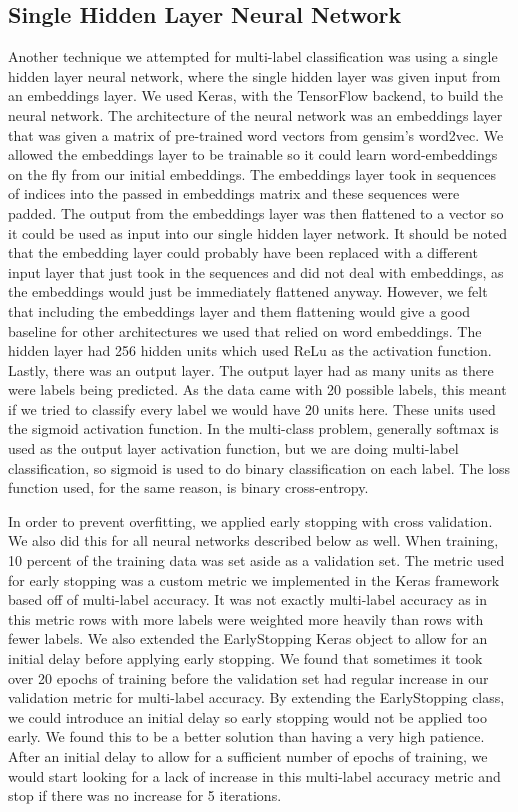 \documentclass[sigconf]{acmart}
\begin{document}
\subsection{Single Hidden Layer Neural Network}
Another technique we attempted for multi-label classification was using a single hidden layer neural network, where the single hidden layer was given input from an embeddings layer. We used Keras, with the TensorFlow backend, to build the neural network.  The architecture of the neural network was an embeddings layer that was given a matrix of pre-trained word vectors from gensim's word2vec.  We allowed the embeddings layer to be trainable so it could learn word-embeddings on the fly from our initial embeddings. The embeddings layer took in sequences of indices into the passed in embeddings matrix and these sequences were padded. The output from the embeddings layer was then flattened to a vector so it could be used as input into our single hidden layer network. It should be noted that the embedding layer could probably have been replaced with a different input layer that just took in the sequences and did not deal with embeddings, as the embeddings would just be immediately flattened anyway.  However, we felt that including the embeddings layer and them flattening would give a good baseline for other architectures we used that relied on word embeddings.  The hidden layer had 256 hidden units which used ReLu as the activation function.  Lastly, there was an output layer.  The output layer had as many units as there were labels being predicted. As the data came with 20 possible labels, this meant if we tried to classify every label we would have 20 units here.  These units used the sigmoid activation function. In the multi-class problem, generally softmax is used as the output layer activation function, but we are doing multi-label classification, so sigmoid is used to do binary classification on each label.  The loss function used, for the same reason, is binary cross-entropy. 

In order to prevent overfitting, we applied early stopping with cross validation. We also did this for all neural networks described below as well.  When training, 10 percent of the training data was set aside as a validation set.  The metric used for early stopping was a custom metric we implemented in the Keras framework based off of multi-label accuracy. It was not exactly multi-label accuracy as in this metric rows with more labels were weighted more heavily than rows with fewer labels. We also extended the EarlyStopping Keras object to allow for an initial delay before applying early stopping. We found that sometimes it took over 20 epochs of training before the validation set had regular increase in our validation metric for multi-label accuracy. By extending the EarlyStopping class, we could introduce an initial delay so early stopping would not be applied too early. We found this to be a better solution than having a very high patience. After an initial delay to allow for a sufficient number of epochs of training, we would start looking for a lack of increase in this multi-label accuracy metric and stop if there was no increase for 5 iterations. 
\end{document}
